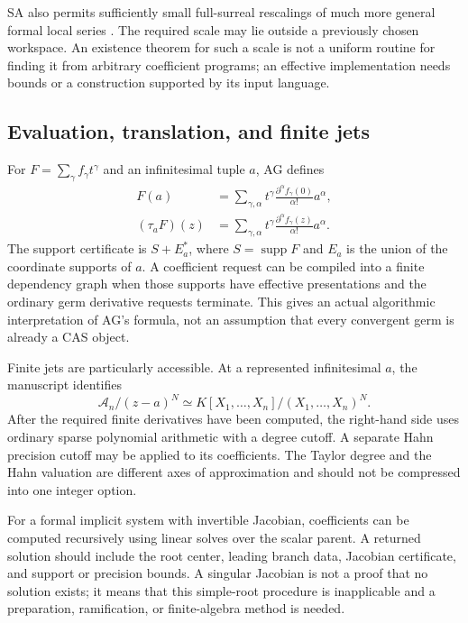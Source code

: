 \documentclass[11pt,letterpaper]{article}
\theoremstyle{definition}\newtheorem{definition}[theorem]{Definition}
\theoremstyle{remark}\newtheorem{remark}[theorem]{Remark}
\newcommand{\Acal}{\mathscr A}\newcommand{\HH}{\mathcal H}\newcommand{\OO}{\mathcal O}
\newcommand{\supp}{\operatorname{supp}}\newcommand{\lc}{\operatorname{lc}}
\numberwithin{equation}{section}\setcounter{tocdepth}{2}
\begin{document}
SA also permits sufficiently small full-surreal rescalings of much more general formal local series \cite[Section 4]{SA}. The required scale may lie outside a previously chosen workspace. An existence theorem for such a scale is not a uniform routine for finding it from arbitrary coefficient programs; an effective implementation needs bounds or a construction supported by its input language.

\subsection{Evaluation, translation, and finite jets}
For $F=\sum_\gamma f_\gamma t^\gamma$ and an infinitesimal tuple $a$, AG defines
\begin{align}
 F(a)&=\sum_{\gamma,\alpha}
 t^\gamma\frac{\partial^\alpha f_\gamma(0)}{\alpha!}a^\alpha,\label{eq:germeval}\\
 (\tau_aF)(z)&=\sum_{\gamma,\alpha}
 t^\gamma\frac{\partial^\alpha f_\gamma(z)}{\alpha!}a^\alpha.\label{eq:germtranslation}
\end{align}
The support certificate is $S+E_a^*$, where $S=\supp F$ and $E_a$ is the union of the coordinate supports of $a$. A coefficient request can be compiled into a finite dependency graph when those supports have effective presentations and the ordinary germ derivative requests terminate. This gives an actual algorithmic interpretation of AG's formula, not an assumption that every convergent germ is already a CAS object.

Finite jets are particularly accessible. At a represented infinitesimal $a$, the manuscript identifies
\begin{equation}\label{eq:finitejets}
 \Acal_n/(z-a)^N\simeq
 K[X_1,\ldots,X_n]/(X_1,\ldots,X_n)^N.
\end{equation}
After the required finite derivatives have been computed, the right-hand side uses ordinary sparse polynomial arithmetic with a degree cutoff. A separate Hahn precision cutoff may be applied to its coefficients. The Taylor degree and the Hahn valuation are different axes of approximation and should not be compressed into one integer option.

For a formal implicit system with invertible Jacobian, coefficients can be computed recursively using linear solves over the scalar parent. A returned solution should include the root center, leading branch data, Jacobian certificate, and support or precision bounds. A singular Jacobian is not a proof that no solution exists; it means that this simple-root procedure is inapplicable and a preparation, ramification, or finite-algebra method is needed.
\end{document}
